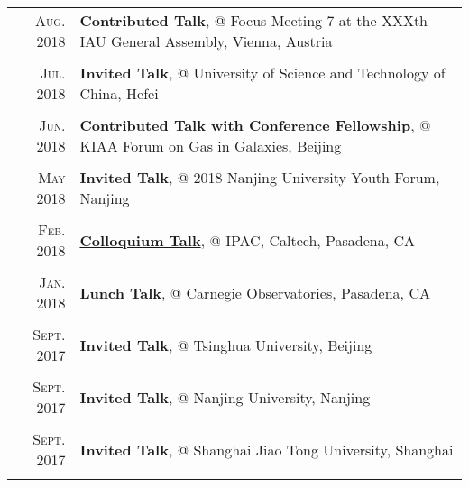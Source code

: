 \documentclass[letterpaper,10pt]{article}
\newcommand{\textwrap}{5.8in}       %
\begin{document}
\begin{longtable}{r|p{\textwrap}}
    \textsc{Aug. 2018}   &   \textbf{Contributed Talk}, @ Focus Meeting 7 at the XXXth IAU General Assembly, Vienna, Austria \\
    \multicolumn{2}{c}{} \\

    \textsc{Jul. 2018}   &   \textbf{Invited Talk}, @ University of Science and Technology of China, Hefei \\
    \multicolumn{2}{c}{} \\

    \textsc{Jun. 2018}   &   \textbf{Contributed Talk with Conference Fellowship}, @ KIAA Forum on Gas in Galaxies, Beijing \\
    \multicolumn{2}{c}{} \\

    \textsc{May 2018}   &   \textbf{Invited Talk}, @ 2018 Nanjing University Youth Forum, Nanjing \\
    \multicolumn{2}{c}{} \\

    \textsc{Feb. 2018}   &   \href{https://www.ipac.caltech.edu/event/358}{\textbf{Colloquium Talk}}, @ IPAC, Caltech, Pasadena, CA \\
    \multicolumn{2}{c}{} \\

    \textsc{Jan. 2018}   &   \textbf{Lunch Talk}, @ Carnegie Observatories, Pasadena, CA \\
    \multicolumn{2}{c}{} \\

    \textsc{Sept. 2017}   &   \textbf{Invited Talk}, @ Tsinghua University, Beijing \\
    \multicolumn{2}{c}{} \\

    \textsc{Sept. 2017}   &   \textbf{Invited Talk}, @ Nanjing University, Nanjing \\
    \multicolumn{2}{c}{} \\

    \textsc{Sept. 2017}   &   \textbf{Invited Talk}, @ Shanghai Jiao Tong University, Shanghai \\
    \multicolumn{2}{c}{} \\



\end{longtable}
\end{document}
